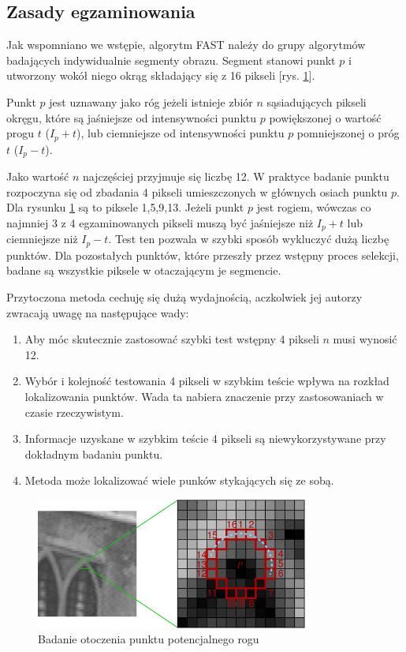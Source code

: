 \subsection{Zasady egzaminowania}
Jak wspomniano we wstępie, algorytm FAST należy do grupy algorytmów badających indywidualnie segmenty obrazu. Segment stanowi punkt $p$ i utworzony wokół niego okrąg składający się z 16 pikseli [rys. \ref{fig:fast_test_segment}]. 

Punkt $p$ jest uznawany jako róg jeżeli istnieje zbiór $n$ sąsiadujących pikseli okręgu, które są jaśniejsze od  intensywności punktu $p$ powiększonej o wartość progu $t$ ($I_p + t$), lub ciemniejsze od intensywności punktu $p$ pomniejszonej o próg $t$ ($I_p - t$). 

Jako wartość $n$ najczęściej przyjmuje się liczbę 12. W praktyce badanie punktu rozpoczyna się od zbadania 4 pikseli umieszczonych w głównych osiach punktu $p$. Dla rysunku \ref{fig:fast_test_segment} są to piksele 1,5,9,13. Jeżeli punkt $p$ jest rogiem, wówczas co najmniej 3 z 4 egzaminowanych pikseli muszą być jaśniejsze niż $I_p + t$ lub ciemniejsze niż $I_p - t$. Test ten pozwala w szybki sposób wykluczyć dużą liczbę punktów. Dla pozostałych punktów, które przeszły przez wstępny proces selekcji, badane są wszystkie piksele w otaczającym je segmencie.

Przytoczona metoda cechuję się dużą wydajnością, aczkolwiek jej autorzy zwracają uwagę na następujące wady:
\begin{enumerate}
\item Aby móc skutecznie zastosować szybki test wstępny 4 pikseli $n$ musi wynosić 12.
\item Wybór i kolejność testowania 4 pikseli w szybkim teście wpływa na rozkład lokalizowania punktów. Wada ta nabiera znaczenie przy zastosowaniach w czasie rzeczywistym.
\item Informacje uzyskane w szybkim teście 4 pikseli są niewykorzystywane przy dokładnym badaniu punktu.
\item Metoda może lokalizować wiele punków stykających się ze sobą.
\end{enumerate}



\begin{figure}[!htb]
\centering
\includegraphics[width=0.8\textwidth]{pict/02/fast/fast_test_segment.png}
\caption{Badanie otoczenia punktu potencjalnego rogu}
\label{fig:fast_test_segment}
\end{figure}





